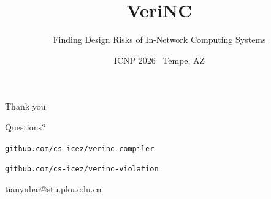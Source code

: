 \documentclass[aspectratio=169,12pt]{beamer}
\title{VeriNC}
\subtitle{Finding Design Risks of In-Network Computing Systems}
\author{}
\institute{}
\date{ICNP 2026 \textperiodcentered\ Tempe, AZ}
\begin{document}
\darktitlepage[1]   %






\begin{frame}[standout]
  \vspace*{0pt}

  {\Large Thank you}

  \vspace{1.0em}
  {\large Questions?}

  \vspace{1.4em}
  {\footnotesize\texttt{github.com/cs-icez/verinc-compiler}}

  {\footnotesize\texttt{github.com/cs-icez/verinc-violation}}

  \vspace{0.8em}
  {\footnotesize tianyubai@stu.pku.edu.cn}
\end{frame}
\end{document}
